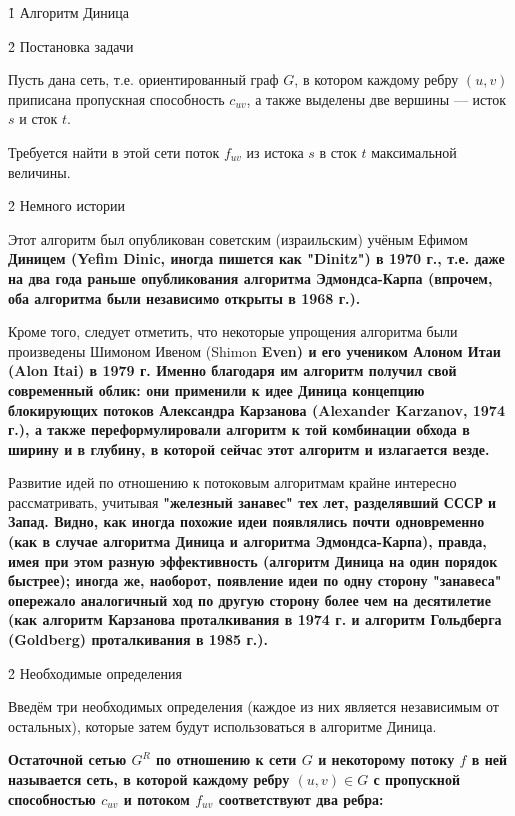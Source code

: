 \h1{ Алгоритм Диница }



\h2{ Постановка задачи }

Пусть дана сеть, т.е. ориентированный граф $G$, в котором каждому ребру $(u,v)$ приписана пропускная способность $c_{uv}$, а также выделены две вершины --- исток $s$ и сток $t$.

Требуется найти в этой сети поток $f_{uv}$ из истока $s$ в сток $t$ максимальной величины.



\h2{ Немного истории }

Этот алгоритм был опубликован советским (израильским) учёным Ефимом \bf{Диницем} (Yefim Dinic, иногда пишется как "Dinitz") в 1970 г., т.е. даже на два года раньше опубликования алгоритма Эдмондса-Карпа (впрочем, оба алгоритма были независимо открыты в 1968 г.).

Кроме того, следует отметить, что некоторые упрощения алгоритма были произведены Шимоном Ивеном (Shimon \bf{Even}) и его учеником Алоном Итаи (Alon \bf{Itai}) в 1979 г. Именно благодаря им алгоритм получил свой современный облик: они применили к идее Диница концепцию блокирующих потоков Александра Карзанова (Alexander Karzanov, 1974 г.), а также переформулировали алгоритм к той комбинации обхода в ширину и в глубину, в которой сейчас этот алгоритм и излагается везде.

Развитие идей по отношению к потоковым алгоритмам крайне интересно рассматривать, учитывая \bf{"железный занавес"} тех лет, разделявший СССР и Запад. Видно, как иногда похожие идеи появлялись почти одновременно (как в случае алгоритма Диница и алгоритма Эдмондса-Карпа), правда, имея при этом разную эффективность (алгоритм Диница на один порядок быстрее); иногда же, наоборот, появление идеи по одну сторону "занавеса" опережало аналогичный ход по другую сторону более чем на десятилетие (как алгоритм Карзанова проталкивания в 1974 г. и алгоритм Гольдберга (Goldberg) проталкивания в 1985 г.).



\h2{ Необходимые определения }

Введём три необходимых определения (каждое из них является независимым от остальных), которые затем будут использоваться в алгоритме Диница.

\bf{Остаточной сетью $G^R$} по отношению к сети $G$ и некоторому потоку $f$ в ней называется сеть, в которой каждому ребру $(u,v) \in G$ с пропускной способностью $c_{uv}$ и потоком $f_{uv}$ соответствуют два ребра:

